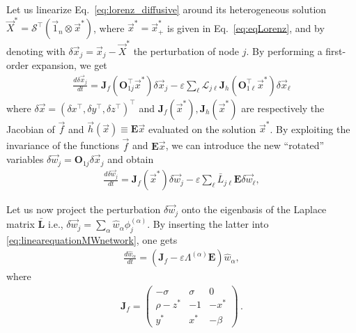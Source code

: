\documentclass[aps,showpacs,preprintnumbers,amsmath,amssymb,twocolumn,superscriptaddress,floatfix,nofootinbib,10pt,pre]{revtex4-1}
\begin{document}
Let us linearize Eq.~\eqref{eq:lorenz_diffusive} around its heterogeneous solution $\vec{X}^*=\mathcal{S}^\top(\vec{1}_n\otimes \vec{x}^*)$, where $\vec{x}^*=\vec{x}^*_+$ is given in Eq.~\eqref{eq:eqLorenz}, and by denoting with $\delta \vec{x}_j = \vec{x}_j - \vec{X}^*$ the perturbation of node $j$. By performing a first-order expansion, we get
\begin{align}
\frac{d\delta \vec{x}_j}{dt} = \mathbf{J}_f (\mathbf{O}_{1j}^\top \vec{x}^*) \delta \vec{x}_j - \varepsilon \sum_\ell \mathcal{L}_{j\ell} \mathbf{J}_h (\mathbf{O}_{1\ell}^\top \vec{x}^*) \delta \vec{x}_\ell 
\end{align}
where $\delta \vec{x} = (\delta x^\top, \delta y^\top, \delta z^\top)^\top$ and $\mathbf{J}_f (\vec{x}^*), \mathbf{J}_h (\vec{x}^*)$ are respectively the Jacobian of $\vec{f}$ and $\vec{h}(\vec{x})\equiv \mathbf{E}\vec{x}$ evaluated on the solution $\vec{x}^*$. By exploiting the invariance of the functions $\vec{f}$ and $\mathbf{E}\vec{x}$, we can introduce the new ``rotated'' variables $\delta \vec{w}_j = \mathbf{O}_{1j} \delta \vec{x}_j$ and obtain
\begin{align}
 \label{eq:linearequationMWnetwork}   
\frac{d\delta \vec{w}_j}{dt}  = \mathbf{J}_f (\vec{x}^*) \delta \vec{w}_j - \varepsilon\sum_\ell \bar{L}_{j\ell} \mathbf{E} \delta \vec{w}_\ell ,
\end{align}

Let us now project the perturbation $\delta \vec{w}_j$ onto the eigenbasis of the Laplace matrix $\bar{\mathbf{L}}$ i.e., $\delta \vec{w}_j = \sum_\alpha\hat{w}_\alpha\phi_j^{(\alpha)}$.  By inserting the latter into \eqref{eq:linearequationMWnetwork}, one gets 
\begin{align}
    \frac{d{\hat{w}}_\alpha}{dt} = \left(\mathbf J_f - \varepsilon\Lambda^{(\alpha)}\mathbf E\right)\hat{w}_\alpha,
\end{align}
where 
\begin{align}
    \mathbf J_f =
    \begin{pmatrix}
        -\sigma & \sigma & 0 \\
        \rho-z^* & -1 & -x^* \\
        y^* & x^* & -\beta
    \end{pmatrix}\, .
\end{align}
\end{document}
